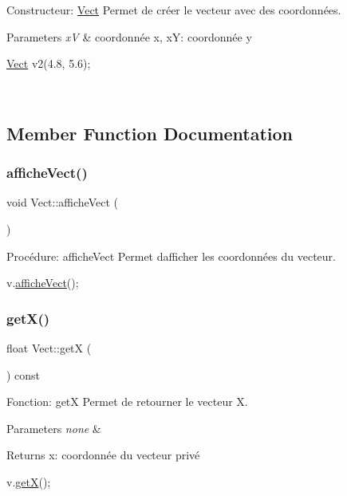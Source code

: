 Constructeur\+: \hyperlink{classVect}{Vect} Permet de créer le vecteur avec des coordonnées. 


\begin{DoxyParams}{Parameters}
{\em xV} & coordonnée x, xY\+: coordonnée y 
\begin{DoxyCode}
\hyperlink{classVect}{Vect} v2(4.8, 5.6);
\end{DoxyCode}
 \\
\hline
\end{DoxyParams}


\subsection{Member Function Documentation}
\mbox{\label{classVect_afba6ce27d6700dddeb9272cdf39c66e3}} 
\subsubsection{\texorpdfstring{affiche\+Vect()}{afficheVect()}}
{\footnotesize\ttfamily void Vect\+::affiche\+Vect (\begin{DoxyParamCaption}{ }\end{DoxyParamCaption})}



Procédure\+: affiche\+Vect Permet d\textquotesingle{}afficher les coordonnées du vecteur. 


\begin{DoxyCode}
v.\hyperlink{classVect_afba6ce27d6700dddeb9272cdf39c66e3}{afficheVect}();
\end{DoxyCode}
 \mbox{\label{classVect_a8925192fe8666b52b2385ff006ab3213}} 
\subsubsection{\texorpdfstring{get\+X()}{getX()}}
{\footnotesize\ttfamily float Vect\+::getX (\begin{DoxyParamCaption}{ }\end{DoxyParamCaption}) const}



Fonction\+: getX Permet de retourner le vecteur X. 


\begin{DoxyParams}{Parameters}
{\em none} & \\
\hline
\end{DoxyParams}
\begin{DoxyReturn}{Returns}
x\+: coordonnée du vecteur privé 
\begin{DoxyCode}
v.\hyperlink{classVect_a8925192fe8666b52b2385ff006ab3213}{getX}();
\end{DoxyCode}
 
\end{DoxyReturn}
\mbox{\label{classVect_a2e44111683aae147cd053ac6002f5992}} 
